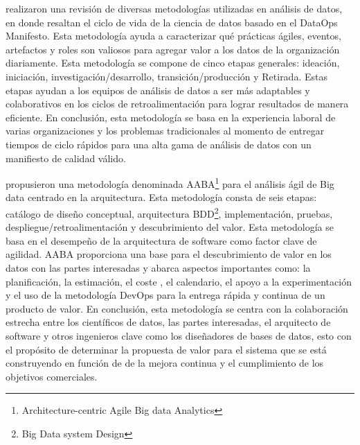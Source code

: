 \cite{Dastgerdi2021} realizaron una revisión de diversas metodologías utilizadas en análisis de datos, en donde resaltan el ciclo de vida de la ciencia de datos basado en el DataOps Manifesto. Esta metodología ayuda a caracterizar qué prácticas ágiles, eventos, artefactos y roles son valiosos para agregar valor a los datos de la organización diariamente. Esta metodología se compone de cinco etapas generales: ideación, iniciación, investigación/desarrollo, transición/producción y Retirada. Estas etapas ayudan a los equipos de análisis de datos a ser más adaptables y colaborativos en los ciclos de retroalimentación para lograr resultados de manera eficiente. En conclusión, esta metodología se basa en la experiencia laboral de varias organizaciones y los problemas tradicionales al momento de entregar tiempos de ciclo rápidos para una alta gama de análisis de datos con un manifiesto de calidad válido.

\cite{Chen2016} propusieron una metodología denominada AABA\footnote{Architecture-centric Agile Big data Analytics} para el análisis ágil de Big data centrado en la arquitectura. Esta metodología consta de seis etapas: catálogo de diseño conceptual, arquitectura BDD\footnote{Big Data system Design}, implementación, pruebas, despliegue/retroalimentación y descubrimiento del valor. Esta metodología se basa en el desempeño de la arquitectura de software como factor clave de agilidad. AABA proporciona una base para el descubrimiento de valor en los datos con las partes interesadas y abarca aspectos importantes como: la planificación, la estimación, el coste , el calendario, el apoyo a la experimentación y el uso de la metodología DevOps para la entrega rápida y continua de un producto de valor. En conclusión, esta metodología se centra con la colaboración estrecha entre los científicos de datos, las partes interesadas, el arquitecto de software y otros ingenieros clave como los diseñadores de bases de datos, esto con el propósito de determinar la propuesta de valor para el sistema que se está construyendo en función de de la mejora continua y el cumplimiento de los objetivos comerciales.

